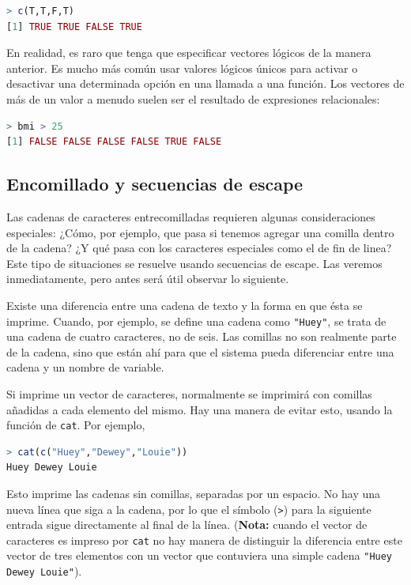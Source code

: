 \documentclass[spanish]{extbook}
\numberwithin{equation}{section}
\numberwithin{figure}{section}
\begin{document}
\begin{lstlisting}[language=R]
> c(T,T,F,T)
[1] TRUE TRUE FALSE TRUE
\end{lstlisting}

En realidad, es raro que tenga que especificar vectores lógicos de la manera
anterior. Es mucho más común usar valores lógicos únicos para activar o
desactivar una determinada opción en una llamada a una función. Los vectores de
más de un valor a menudo suelen ser el resultado de expresiones relacionales:


\begin{lstlisting}[language=R]
> bmi > 25
[1] FALSE FALSE FALSE FALSE TRUE FALSE
\end{lstlisting}

\subsection{Encomillado y secuencias de escape}

Las cadenas de caracteres entrecomilladas requieren algunas consideraciones
especiales: ¿Cómo, por ejemplo, que pasa si tenemos agregar una comilla dentro
de la cadena? ¿Y qué pasa con los caracteres especiales como el de fin de
linea? Este tipo de situaciones se resuelve usando secuencias de escape. Las
veremos inmediatamente, pero antes será útil observar lo siguiente.

Existe una diferencia entre una cadena de texto y la forma en que ésta se
imprime. Cuando, por ejemplo, se define una cadena como \texttt{"Huey"}, se
trata de una cadena de cuatro caracteres, no de seis. Las comillas no son
realmente parte de la cadena, sino que están ahí para que el sistema pueda
diferenciar entre una cadena y un nombre de variable.

Si imprime un vector de caracteres, normalmente se imprimirá con comillas
añadidas a cada elemento del mismo. Hay una manera de evitar esto, usando la
función de \texttt{cat}.  Por ejemplo,

\begin{lstlisting}[language=R]
> cat(c("Huey","Dewey","Louie"))
Huey Dewey Louie
\end{lstlisting}

Esto imprime las cadenas sin comillas, separadas por un espacio. No hay una
nueva línea que siga a la cadena, por lo que el símbolo (\texttt{>}) para la
siguiente entrada sigue directamente al final de la línea. (\textbf{Nota:}
cuando el vector de caracteres es impreso por \texttt{cat} no hay manera de
distinguir la diferencia entre este vector de tres elementos con un vector que
contuviera una simple cadena \texttt{"Huey Dewey Louie"}).
\end{document}
